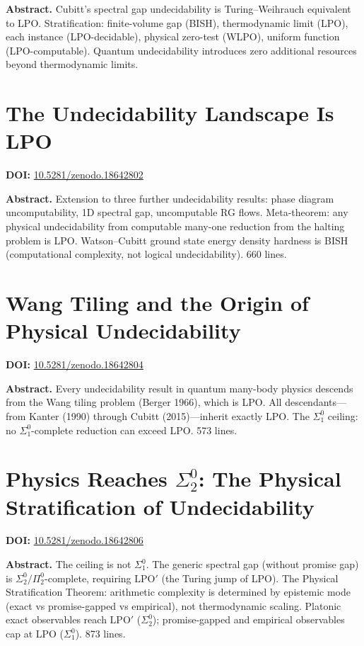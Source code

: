 \documentclass[11pt,a4paper]{article}
\begin{document}
\bigskip
\noindent\textbf{Abstract.}
Cubitt's spectral gap undecidability is Turing--Weihrauch equivalent to LPO. Stratification: finite-volume gap (BISH), thermodynamic limit (LPO), each instance (LPO-decidable), physical zero-test (WLPO), uniform function (LPO-computable). Quantum undecidability introduces zero additional resources beyond thermodynamic limits.

\section{The Undecidability Landscape Is LPO}
\label{sec:p37}
\textbf{DOI:} \href{https://doi.org/10.5281/zenodo.18642802}{10.5281/zenodo.18642802}

\bigskip
\noindent\textbf{Abstract.}
Extension to three further undecidability results: phase diagram uncomputability, 1D spectral gap, uncomputable RG flows. Meta-theorem: any physical undecidability from computable many-one reduction from the halting problem is LPO. Watson--Cubitt ground state energy density hardness is BISH (computational complexity, not logical undecidability). 660 lines.

\section{Wang Tiling and the Origin of Physical Undecidability}
\label{sec:p38}
\textbf{DOI:} \href{https://doi.org/10.5281/zenodo.18642804}{10.5281/zenodo.18642804}

\bigskip
\noindent\textbf{Abstract.}
Every undecidability result in quantum many-body physics descends from the Wang tiling problem (Berger 1966), which is LPO. All descendants---from Kanter (1990) through Cubitt (2015)---inherit exactly LPO. The $\Sigma_1^0$ ceiling: no $\Sigma_1^0$-complete reduction can exceed LPO. 573 lines.

\section{Physics Reaches $\Sigma_2^0$: The Physical Stratification of Undecidability}
\label{sec:p39}
\textbf{DOI:} \href{https://doi.org/10.5281/zenodo.18642806}{10.5281/zenodo.18642806}

\bigskip
\noindent\textbf{Abstract.}
The ceiling is not $\Sigma_1^0$. The generic spectral gap (without promise gap) is $\Sigma_2^0/\Pi_2^0$-complete, requiring $\text{LPO}'$ (the Turing jump of LPO). The Physical Stratification Theorem: arithmetic complexity is determined by epistemic mode (exact vs promise-gapped vs empirical), not thermodynamic scaling. Platonic exact observables reach $\text{LPO}'$ ($\Sigma_2^0$); promise-gapped and empirical observables cap at LPO ($\Sigma_1^0$). 873 lines.
\end{document}
